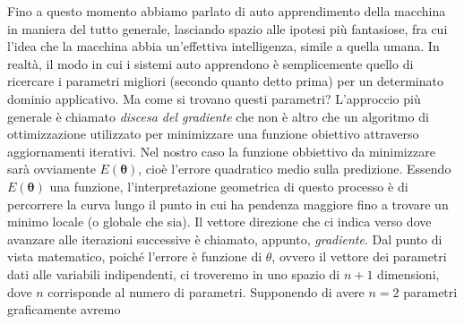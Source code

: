 \documentclass[12pt,a4paper,twoside,openright]{book}
\begin{document}
Fino a questo momento abbiamo parlato di auto apprendimento della macchina in maniera del tutto generale, lasciando spazio alle ipotesi più fantasiose, fra cui l'idea che la macchina abbia un'effettiva intelligenza, simile a quella umana. In realtà, il modo in cui i sistemi auto apprendono è semplicemente quello di ricercare i parametri migliori (secondo quanto detto prima) per un determinato dominio applicativo. Ma come si trovano questi parametri? 
L'approccio più generale è chiamato \emph{discesa del gradiente} che non è altro che un algoritmo di ottimizzazione utilizzato per minimizzare una funzione obiettivo attraverso aggiornamenti iterativi. Nel nostro caso la funzione obbiettivo da minimizzare sarà ovviamente $E(\mathbf{\theta})$, cioè l'errore quadratico medio sulla predizione.
Essendo $E(\mathbf{\theta})$ una funzione, l'interpretazione geometrica di questo processo è di percorrere la curva lungo il punto in cui ha pendenza maggiore fino a trovare un minimo locale (o globale che sia).
Il vettore direzione che ci indica verso dove avanzare alle iterazioni successive è chiamato, appunto, \emph{gradiente}.
Dal punto di vista matematico, poiché l'errore è funzione di $\theta$, ovvero il vettore dei parametri dati alle variabili indipendenti, ci troveremo in uno spazio di $n+1$ dimensioni, dove $n$ corrisponde al numero di parametri. Supponendo di avere $n=2$ parametri graficamente avremo
\end{document}
